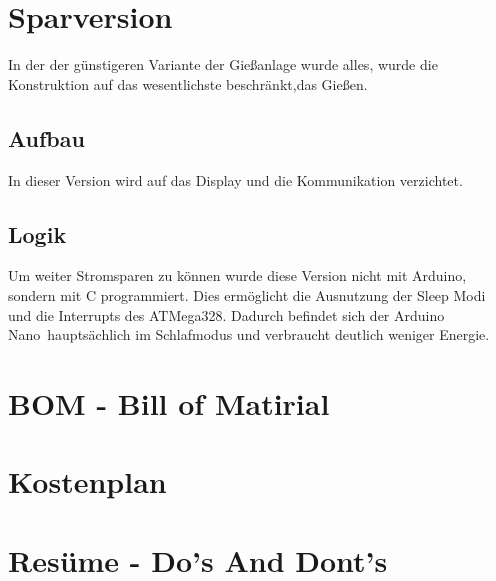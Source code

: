 \documentclass[]{IEEEtran}
\begin{document}
\section{Sparversion}
	In der der günstigeren Variante der Gießanlage wurde alles, wurde die Konstruktion auf das wesentlichste beschränkt,das Gießen.
	\subsection{Aufbau}
	In dieser Version wird auf das Display und die Kommunikation verzichtet.
	
	\subsection{Logik}
	Um weiter Stromsparen zu können wurde diese Version nicht mit Arduino, sondern mit C programmiert.
	Dies ermöglicht die Ausnutzung der Sleep Modi und die Interrupts des ATMega328. 
	Dadurch befindet sich der \glqq Arduino Nano\grqq \ hauptsächlich im Schlafmodus und verbraucht deutlich weniger Energie. 
	
\section{BOM - Bill of Matirial}
	
	\section{Kostenplan}
	
	\section{Resüme - Do's And Dont's}	
\end{document}
